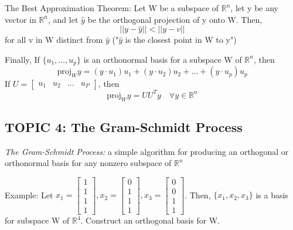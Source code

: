 \documentclass[12pt]{article} %
\newcommand{\R}{\mathbb{R}}
\begin{document}
The Best Approximation Theorem:
Let W be a subspace of $\R^n$, let y be any vector in $\R^n$, and let $\hat{y}$ be the orthogonal projection of y onto W. 
Then, 
$$||y - \hat{y}|| < ||y - v||$$
for all v in W distinct from $\hat{y}$
("$\hat{y}$ is the closest point in W to y")

Finally,
If $\{u_1, ..., u_p\}$ is an orthonormal basis for a subspace W of $\R^n$, then 
$$\text{proj}_W y = (y \cdot u_1) u_1 + (y \cdot u_2) u_2 + ... + (y \cdot u_p) u_p$$
If $U = \begin{bmatrix}
	u_ 1 & u_2 & ... & u_P
\end{bmatrix}$, then
$$\text{proj}_W y = UU^T y \quad \forall y \in \R^n$$

\subsection{TOPIC 4: The Gram-Schmidt Process}
\emph{The Gram-Schmidt Process:} a simple algorithm for producing an orthogonal or orthonormal basis for any nonzero subspace of $\R^n$

Example: 
Let $x_1 = \begin{bmatrix}
	1\\1\\1\\1
\end{bmatrix}, x_2 = \begin{bmatrix}
	0\\1\\1\\1
\end{bmatrix}, x_3 = \begin{bmatrix}
	0\\0\\1\\1
\end{bmatrix}$. Then, $\{x_1, x_2, x_3\}$ is a basis for subspace W of $\R^4$. Construct an orthogonal basis for W.
\end{document}
